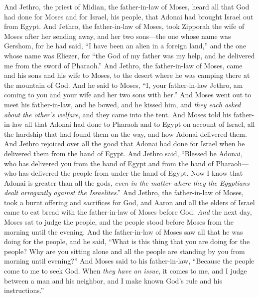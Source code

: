 \begin{biblechapter} %
 And Jethro, the priest of Midian, the father-in-law of Moses, heard all that God had done for Moses and for Israel, his people, that Adonai had brought Israel out from Egypt.
\verse And Jethro, the father-in-law of Moses, took Zipporah the wife of Moses after her sending away,
\verse and her two sons—the one whose name was Gershom, for he had said, “I have been an alien in a foreign land,”
\verse and the one whose name was Eliezer, for “the God of my father was my help, and he delivered me from the sword of Pharaoh.”
\verse And Jethro, the father-in-law of Moses, came and his sons and his wife to Moses, to the desert where he was camping there at the mountain of God.
\verse And he said to Moses, “I, your father-in-law Jethro, am coming to you and your wife and her two sons with her.”
\verse And Moses went out to meet his father-in-law, and he bowed, and he kissed him, and \textit{they each asked about the other’s welfare}, and they came into the tent.
\verse And Moses told his father-in-law all that Adonai had done to Pharaoh and to Egypt on account of Israel, all the hardship that had found them on the way, and how Adonai delivered them.
\verse And Jethro rejoiced over all the good that Adonai had done for Israel when he delivered them from the hand of Egypt.
\verse And Jethro said, “Blessed be Adonai, who has delivered you from the hand of Egypt and from the hand of Pharaoh—who has delivered the people from under the hand of Egypt.
\verse Now I know that Adonai is greater than all the gods, \textit{even in the matter where they the Egyptians dealt arrogantly against the Israelites}.”
\verse And Jethro, the father-in-law of Moses, took a burnt offering and sacrifices for God, and Aaron and all the elders of Israel came to eat bread with the father-in-law of Moses before God.
\verse \textit{And} the next day, Moses sat to judge the people, and the people stood before Moses from the morning until the evening.
\verse And the father-in-law of Moses saw all that he was doing for the people, and he said, “What is this thing that you are doing for the people? Why are you sitting alone and all the people are standing by you from morning until evening?”
\verse And Moses said to his father-in-law, “Because the people come to me to seek God.
\verse When \textit{they have an issue}, it comes to me, and I judge between a man and his neighbor, and I make known God’s rule and his instructions.”

\end{biblechapter}
